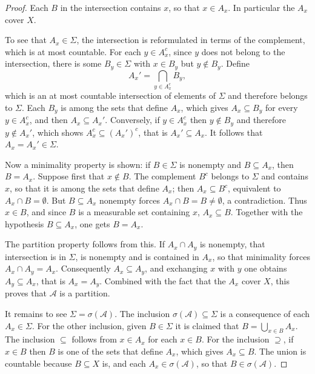 \documentclass[11pt, a4paper]{article}
\begin{document}
\begin{proof}
Each $B$ in the intersection contains $x$, so that $x \in A_x$. In particular the $A_x$
cover $X$.

To see that $A_x \in \Sigma$, the intersection is reformulated in terms of the complement, which is
at most countable. For each $y \in A_x^c$, since $y$ does not belong to the intersection,
there is some $B_y \in \Sigma$ with $x \in B_y$ but $y \notin B_y$. Define
$$ A_x' = \bigcap_{y \in A_x^c} B_y, $$
which is an at most countable intersection of elements of $\Sigma$ and therefore belongs to
$\Sigma$. Each $B_y$ is among the sets that define $A_x$, which gives $A_x \subseteq B_y$
for every $y \in A_x^c$, and then $A_x \subseteq A_x'$. Conversely, if $y \in A_x^c$
then $y \notin B_y$ and therefore $y \notin A_x'$, which shows $A_x^c \subseteq (A_x')^c$,
that is $A_x' \subseteq A_x$. It follows that $A_x = A_x' \in \Sigma$.

Now a minimality property is shown: if $B \in \Sigma$ is nonempty and $B \subseteq A_x$,
then $B = A_x$. Suppose first that $x \notin B$. The complement $B^c$ belongs to $\Sigma$
and contains $x$, so that it is among the sets that define $A_x$; then $A_x \subseteq
B^c$, equivalent to $A_x \cap B = \emptyset$. But $B \subseteq A_x$ nonempty forces $A_x \cap B
= B \ne \emptyset$, a contradiction. Thus $x \in B$, and since $B$ is a measurable set containing $x$,
$A_x \subseteq B$. Together with the hypothesis $B \subseteq A_x$, one gets $B = A_x$.

The partition property follows from this. If $A_x \cap A_y$ is nonempty, that intersection
is in $\Sigma$, is nonempty and is contained in $A_x$, so that minimality forces
$A_x \cap A_y = A_x$. Consequently $A_x \subseteq A_y$, and exchanging $x$ with $y$ one
obtains $A_y \subseteq A_x$, that is $A_x = A_y$. Combined with the fact that the $A_x$ cover $X$, this
proves that $\mathcal{A}$ is a partition.

It remains to see $\Sigma = \sigma(\mathcal{A})$. The inclusion $\sigma(\mathcal{A}) \subseteq \Sigma$
is a consequence of each $A_x \in \Sigma$. For the other inclusion, given $B \in \Sigma$
it is claimed that $B = \bigcup_{x \in B} A_x$. The inclusion $\subseteq$ follows from $x \in A_x$ for each $x
\in B$. For the inclusion $\supseteq$, if $x \in B$ then $B$ is one of the sets that
define $A_x$, which gives $A_x \subseteq B$. The union is countable because $B \subseteq X$ is,
and each $A_x \in \sigma(\mathcal{A})$, so that $B \in \sigma(\mathcal{A})$.
\end{proof}
\end{document}
